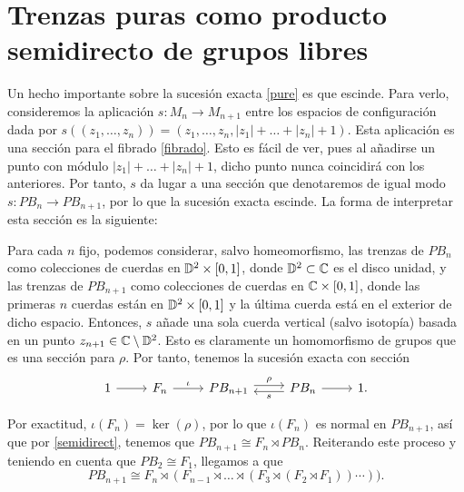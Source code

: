\documentclass[TFG.tex]{subfiles}
\begin{document}



\newpage

\section{Trenzas puras como producto semidirecto de grupos libres}


Un hecho importante sobre la sucesión exacta \ref{pure} es que escinde. Para verlo, consideremos la aplicación $s:M_n\to M_{n+1}$ entre los espacios de configuración dada por $s((z_1,\dots,z_n))=(z_1,\dots,z_n,|z_1|+\dots+|z_n|+1)$. Esta aplicación es una sección para el fibrado \ref{fibrado}. Esto es fácil de ver, pues al añadirse un punto con módulo $|z_1|+\dots+|z_n|+1$, dicho punto nunca coincidirá con los anteriores. Por tanto, $s$ da lugar a una sección que denotaremos de igual modo $s:PB_n\to PB_{n+1}$, por lo que la sucesión exacta escinde. La forma de interpretar esta sección es la siguiente:

Para cada $n$ fijo, podemos considerar, salvo homeomorfismo, las trenzas de $PB_n$ como colecciones de cuerdas en $\mathbb{D}^2\times[0,1]$, donde $\mathbb{D}^2\subset\mathbb{C}$ es el disco unidad, y las trenzas de $PB_{n+1}$ como colecciones de cuerdas en $\mathbb{C}\times[0,1]$, donde las primeras $n$ cuerdas están en $\mathbb{D}^2\times[0,1]$ y la última cuerda está en el exterior de dicho espacio. Entonces, $s$ añade una sola cuerda vertical (salvo isotopía) basada en un punto $z_{n+1}\in\mathbb{C}\setminus\mathbb{D}^2$. Esto es claramente un homomorfismo de grupos que es una sección para $\rho$. Por tanto, tenemos la sucesión exacta con sección
\[
\begin{tikzcd}
1\arrow[r]& F_n\arrow[r, "\iota"] & PB_{n+1}\arrow[r,"\rho", shift left]& \arrow[l,"s",shift left]PB_n\arrow[r] & 1.
\end{tikzcd}
\]

Por exactitud, $\iota(F_n)=\ker(\rho)$, por lo que $\iota(F_n)$ es normal en $PB_{n+1}$, así que por \ref{semidirect}, tenemos que $PB_{n+1}\cong F_n\rtimes PB_n$. Reiterando este proceso y teniendo en cuenta que $PB_2\cong F_1$, llegamos a que 
$$PB_{n+1}\cong F_n\rtimes (F_{n-1} \rtimes\dots\rtimes (F_3\rtimes (F_2\rtimes F_1))\cdots)).$$
\end{document}
